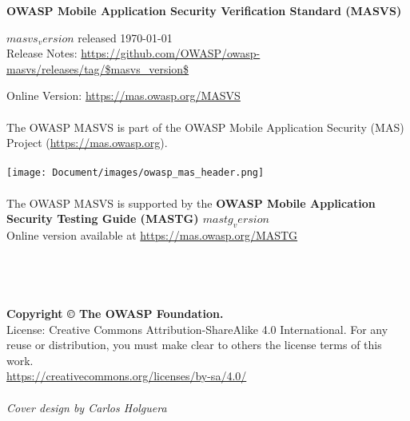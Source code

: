\thispagestyle{empty} %

\textbf{OWASP Mobile Application Security Verification Standard (MASVS)}

$masvs_version$ released \today \\

Release Notes: \url{https://github.com/OWASP/owasp-masvs/releases/tag/$masvs_version$}

Online Version: \url{https://mas.owasp.org/MASVS} \\ \\


The OWASP MASVS is part of the OWASP Mobile Application Security (MAS) Project (\url{https://mas.owasp.org}). \\ \\

\texttt{[image: Document/images/owasp\_mas\_header.png]} \\ \\



The OWASP MASVS is supported by the \textbf{OWASP Mobile Application Security Testing Guide (MASTG) $mastg_version$} \\

Online version available at \url{https://mas.owasp.org/MASTG} \\ \\ \\ \\ \\
 


\textbf{Copyright © The OWASP Foundation.} \\

License: Creative Commons Attribution-ShareAlike 4.0 International.
For any reuse or distribution, you must make clear to others the license terms of this work. \\
\url{https://creativecommons.org/licenses/by-sa/4.0/} \\ \\


\emph{Cover design by Carlos Holguera}